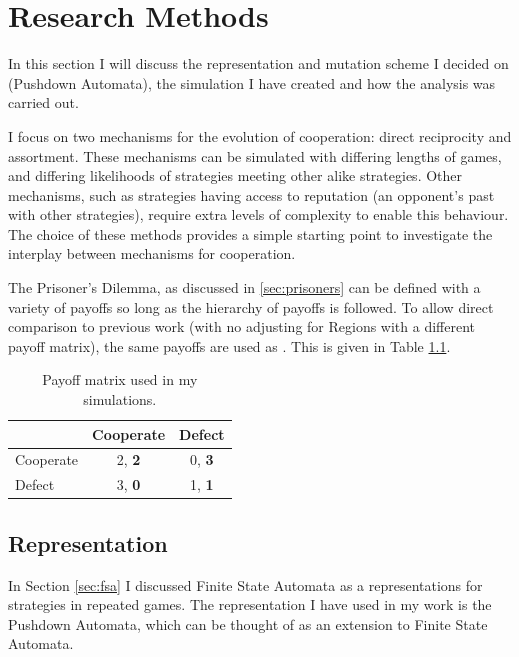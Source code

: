 \documentclass[a4paper,11pt,bcshonoursthesis,singlespace,oneside,thesisdraft,pdflatex]{cssethesis}
\begin{document}
\chapter{Research Methods}
\label{chap:researchmethods}
In this section I will discuss the representation and mutation scheme I decided on (Pushdown Automata), the simulation I have created and how the analysis was carried out.

I focus on two mechanisms for the evolution of cooperation: direct reciprocity and assortment. 
These mechanisms can be simulated with differing lengths of games, and differing likelihoods of strategies meeting other alike strategies. 
Other mechanisms, such as strategies having access to reputation (an opponent's past with other strategies), require extra levels of complexity to enable this behaviour. 
The choice of these methods provides a simple starting point to investigate the interplay between mechanisms for cooperation. 

The Prisoner's Dilemma, as discussed in \ref{sec:prisoners} can be defined with a variety of payoffs so long as the hierarchy of payoffs is followed. 
To allow direct comparison to previous work (with no adjusting for Regions with a different payoff matrix), the same payoffs are used as \citet{van-veelen:PNAS:2012}. 
This is given in Table \ref{table:simpayoffs}.
 
\begin{table}[h]\centering
\captionsetup{justification=centering}
\begin{tabular}{|l|c|c|}
\hline
 & \bf{Cooperate} & \bf{Defect}\\
\hline
Cooperate & 2, \bf{2} & 0, \bf{3}\\
\hline
Defect & 3, \bf{0}  & 1, \bf{1} \\
\hline
\end{tabular}
\caption{Payoff matrix used in my simulations.}
\label{table:simpayoffs}
\end{table}
\section{Representation}
In Section \ref{sec:fsa} I discussed Finite State Automata as a representations for strategies in repeated games. The representation I have used in my work is the Pushdown Automata, which can be thought of as an extension to Finite State Automata. 
\end{document}
